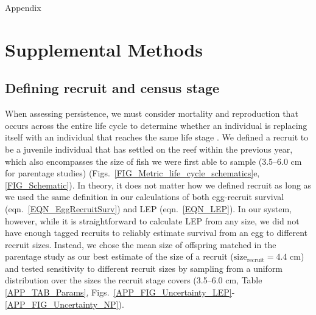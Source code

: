 \documentclass[12pt, oneside]{article}   	%
\begin{document}
{\LARGE Appendix}


\appendix

\renewcommand{\theequation}{A\arabic{equation}}
\renewcommand{\thetable}{A\arabic{table}}
\setcounter{equation}{0}  %
\setcounter{figure}{0}
\setcounter{table}{0}

\section{Supplemental Methods} \label{APP_SUPP_METHODS}

\subsection{Defining recruit and census stage} \label{APP_SEC_METHODS_Recruit_def}

When assessing persistence, we must consider mortality and reproduction that occurs across the entire life cycle to determine whether an individual is replacing itself with an individual that reaches the same life stage \citep{burgess2014beyond}. We defined a recruit to be a juvenile individual that has settled on the reef within the previous year, which also encompasses the size of fish we were first able to sample (3.5--6.0 cm for parentage studies) (Figs.\ \ref{FIG_Metric_life_cycle_schematics}e, \ref{FIG_Schematic}). In theory, it does not matter how we defined recruit as long as we used the same definition in our calculations of both egg-recruit survival (eqn.\ \ref{EQN_EggRecruitSurv}) and LEP (eqn.\ \ref{EQN_LEP}). In our system, however, while it is straightforward to calculate LEP from any size, we did not have enough tagged recruits to reliably estimate survival from an egg to different recruit sizes. Instead, we chose the mean size of offspring matched in the parentage study as our best estimate of the size of a recruit ($\text{size}_\text{recruit} = 4.4$ cm) and tested sensitivity to different recruit sizes by sampling from a uniform distribution over the sizes the recruit stage covers (3.5--6.0 cm, Table \ref{APP_TAB_Params}, Figs.\ \ref{APP_FIG_Uncertainty_LEP}-\ref{APP_FIG_Uncertainty_NP}).
\end{document}
